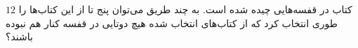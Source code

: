 \EXERCISE
$12$
 کتاب در قفسه‌هایی چیده شده است. به چند طریق می‌توان پنج تا از این کتاب‌ها را طوری انتخاب کرد که از کتاب‌های انتخاب شده هیچ دوتایی در قفسه کنار هم نبوده باشند؟